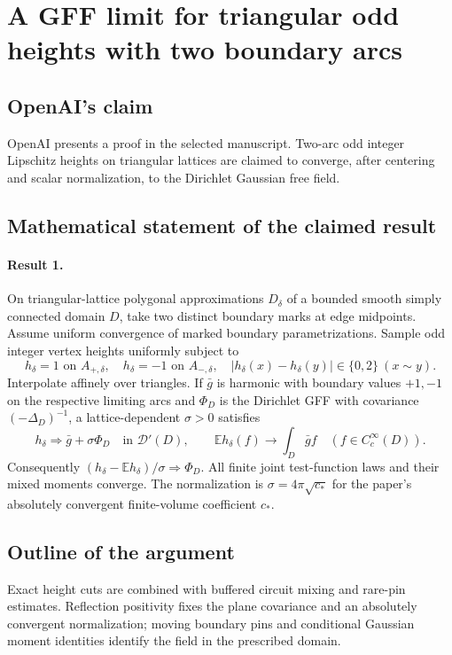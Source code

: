 \documentclass[11pt]{article}
\begin{document}
\section*{A GFF limit for triangular odd heights with two boundary arcs}

\subsection{OpenAI's claim}
OpenAI presents a proof in the selected manuscript. Two-arc odd integer Lipschitz heights on triangular lattices are claimed to converge, after centering and scalar normalization, to the Dirichlet Gaussian free field.

\subsection{Mathematical statement of the claimed result}
\paragraph{Result 1.} On triangular-lattice polygonal approximations $D_\delta$ of a bounded smooth simply connected domain $D$, take two distinct boundary marks at edge midpoints. Assume uniform convergence of marked boundary parametrizations. Sample odd integer vertex heights uniformly subject to
\[
 h_\delta=1\text{ on }A_{+,\delta},\quad h_\delta=-1\text{ on }A_{-,\delta},\quad
 |h_\delta(x)-h_\delta(y)|\in\{0,2\}\ (x\sim y).
\]
Interpolate affinely over triangles. If $\bar g$ is harmonic with boundary values $+1,-1$ on the respective limiting arcs and $\Phi_D$ is the Dirichlet GFF with covariance $(-\Delta_D)^{-1}$, a lattice-dependent $\sigma>0$ satisfies
\[
 h_\delta\Longrightarrow\bar g+\sigma\Phi_D\quad\text{in }\mathcal D'(D),\qquad
 \mathbb Eh_\delta(f)\to\int_D\bar gf\quad(f\in C_c^\infty(D)).
\]
Consequently $(h_\delta-\mathbb Eh_\delta)/\sigma\Longrightarrow\Phi_D$. All finite joint test-function laws and their mixed moments converge. The normalization is $\sigma=4\pi\sqrt{c_*}$ for the paper's absolutely convergent finite-volume coefficient $c_*$.

\subsection{Outline of the argument}
Exact height cuts are combined with buffered circuit mixing and rare-pin estimates. Reflection positivity fixes the plane covariance and an absolutely convergent normalization; moving boundary pins and conditional Gaussian moment identities identify the field in the prescribed domain.
\end{document}
